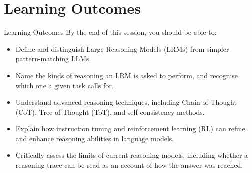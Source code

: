 \section{Learning Outcomes}
\begin{frame}{Learning Outcomes}
    By the end of this session, you should be able to:
    \vspace{0.5em}
    \begin{itemize}
        \item Define and distinguish Large Reasoning Models (LRMs) from simpler pattern-matching LLMs.
        \item Name the kinds of reasoning an LRM is asked to perform, and recognise which one a given task calls for.
        \item Understand advanced reasoning techniques, including Chain-of-Thought (CoT), Tree-of-Thought (ToT), and self-consistency methods.
        \item Explain how instruction tuning and reinforcement learning (RL) can refine and enhance reasoning abilities in language models.
        \item Critically assess the limits of current reasoning models, including whether a reasoning trace can be read as an account of how the answer was reached.
    \end{itemize}
\end{frame}

